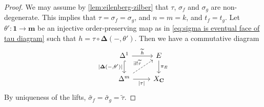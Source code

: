 \begin{proof}
We may assume by \cref{lem:eilenberg-zilber} that $\tau$, $\sigma_f$ and $\sigma_g$ are non-degenerate.
This implies that $\tau = \sigma_f = \sigma_g$, and $n=m=k$, and $t_f = t_g$. Let $\theta' : \mathbf{1} \to \mathbf{m}$ be an injective order-preserving map as in \cref{eq:sigma is eventual face of tau diagram} such that $h = \tau \circ \mathbf{\Delta}(-,\theta')$. Then we have a commutative diagram
\[ \begin{tikzcd}
\Delta^1 \arrow{r}{\widetilde{h}} \arrow[hook, swap]{d}{|\mathbf{\Delta}(-,\theta')|} & E \arrow{d}{\pi_E} \\
\Delta^m \arrow[swap]{r}{|\tau|} \arrow[dashed]{ur}{\exists ! \widetilde{\tau}} & X_{\mathbf{C}} \end{tikzcd} \]
By uniqueness of the lifts, $\widetilde{\sigma_f} = \widetilde{\sigma_g} = \widetilde{\tau}$.


\end{proof}

